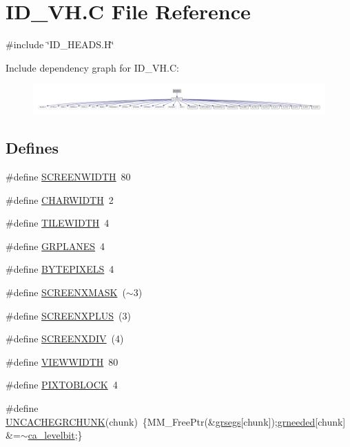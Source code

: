 \hypertarget{ID__VH_8C}{
\section{ID\_\-VH.C File Reference}
\label{ID__VH_8C}
}
{\ttfamily \#include \char`\"{}ID\_\-HEADS.H\char`\"{}}\par
Include dependency graph for ID\_\-VH.C:
\nopagebreak
\begin{figure}[H]
\begin{center}
\leavevmode
\includegraphics[width=400pt]{ID__VH_8C__incl}
\end{center}
\end{figure}
\subsection*{Defines}
\begin{DoxyCompactItemize}
\item 
\#define \hyperlink{ID__VH_8C_ada0cc738d27aad251151e69cb8d250e1}{SCREENWIDTH}~80
\item 
\#define \hyperlink{ID__VH_8C_a45952f78a0f44bd0ac30cd6d49631262}{CHARWIDTH}~2
\item 
\#define \hyperlink{ID__VH_8C_aaf51d37c25b200df1d73f79e19e354b7}{TILEWIDTH}~4
\item 
\#define \hyperlink{ID__VH_8C_af943e6c0f4b6d09ce583aad1c8540ef5}{GRPLANES}~4
\item 
\#define \hyperlink{ID__VH_8C_abd49a133c95c9a4c33ea013463d74f7a}{BYTEPIXELS}~4
\item 
\#define \hyperlink{ID__VH_8C_a9c5f01408933101ef66c5f86e1af9a7b}{SCREENXMASK}~($\sim$3)
\item 
\#define \hyperlink{ID__VH_8C_a99516febca76e52cb634c4bdb8e8d704}{SCREENXPLUS}~(3)
\item 
\#define \hyperlink{ID__VH_8C_aa1b8de7475655a403b628049e6007d41}{SCREENXDIV}~(4)
\item 
\#define \hyperlink{ID__VH_8C_af67316b9cea216c26c8d64e0ce74dd3d}{VIEWWIDTH}~80
\item 
\#define \hyperlink{ID__VH_8C_a8f558f8f0da9ae8d6732a1a56a23a80f}{PIXTOBLOCK}~4
\item 
\#define \hyperlink{ID__VH_8C_a6e78edab29e754af11d59d1a4efaf245}{UNCACHEGRCHUNK}(chunk)~\{MM\_\-FreePtr(\&\hyperlink{ID__CA_8H_aa0e5c34b0901c8cc15a60fe57cb09b3a}{grsegs}\mbox{[}chunk\mbox{]});\hyperlink{ID__CA_8H_aff6ae5a74b0467508c14a3f3b91ffd90}{grneeded}\mbox{[}chunk\mbox{]}\&=$\sim$\hyperlink{ID__CA_8H_af4f718356e28be31a81ef4df1a2f7c96}{ca\_\-levelbit};\}
\end{DoxyCompactItemize}
